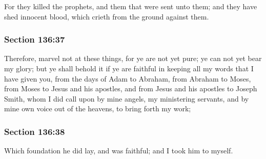 		For they killed the prophets, and them that were sent unto them; and they have shed innocent blood, which crieth from the ground against them.


	\subsubsection{Section 136:37} %
		\label{DC136-37}

		Therefore, marvel not at these things, for ye are not yet pure; ye can not yet bear my glory; but ye shall behold it if ye are faithful in keeping all my words that I have given you, from the days of Adam to Abraham, from Abraham to Moses, from Moses to Jesus and his apostles, and from Jesus and his apostles to Joseph Smith, whom I did call upon by mine angels, my ministering servants, and by mine own voice out of the heavens, to bring forth my work;


	\subsubsection{Section 136:38} %
		\label{DC136-38}

		Which foundation he did lay, and was faithful; and I took him to myself.


